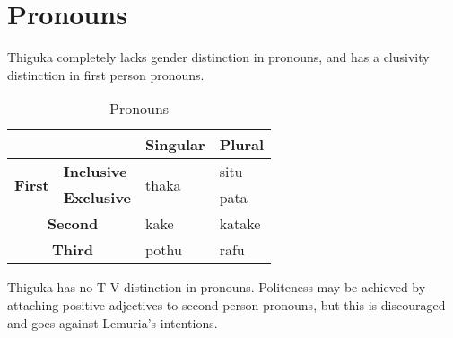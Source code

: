 \section{Pronouns}
Thiguka completely lacks gender distinction in pronouns, and has a clusivity distinction in first person pronouns.

\begin{table}[H]
    \centering
    \caption{Pronouns}
    \begin{tabularx}{25em}{|c|X|X|X|}
        \hline
        \multicolumn{2}{|c|}{} & \textbf{Singular} & \textbf{Plural} \\
        \hline
        \multirow{2}{*}{\textbf{First}} & \textbf{Inclusive} & \multirow{2}{*}{thaka} & situ \\
        \cline{2-2} \cline{4-4}
        & \textbf{Exclusive} & & pata \\
        \hline
        \multicolumn{2}{|c|}{\textbf{Second}} & kake & katake \\
        \hline
        \multicolumn{2}{|c|}{\textbf{Third}} & pothu & rafu \\
        \hline
    \end{tabularx}
\end{table}


Thiguka has no T-V distinction in pronouns. Politeness may be achieved by attaching positive adjectives to second-person pronouns, but this is discouraged and goes against Lemuria's intentions.

